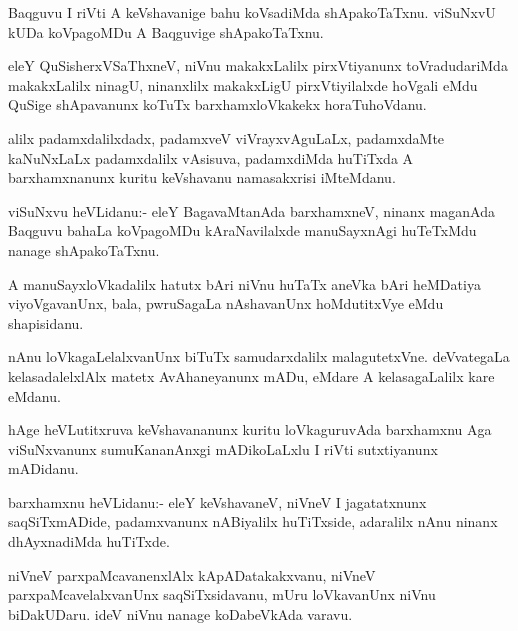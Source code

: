 \documentclass{article}
\begin{document}
\begin{mn}
Baqguvu I riVti A keVshavanige bahu koVsadiMda shApakoTaTxnu. viSuNxvU
kUDa koVpagoMDu A Baqguvige shApakoTaTxnu.
\end{mn}

\begin{mn}
eleY QuSisherxVSaThxneV, niVnu makakxLalilx pirxVtiyanunx
toVradudariMda makakxLalilx ninagU, ninanxlilx makakxLigU
pirxVtiyilalxde hoVgali eMdu QuSige shApavanunx koTuTx
barxhamxloVkakekx horaTuhoVdanu.
\end{mn}

\begin{mn}
alilx padamxdalilxdadx, padamxveV viVrayxvAguLaLx, padamxdaMte
kaNuNxLaLx padamxdalilx vAsisuva, padamxdiMda huTiTxda A
barxhamxnanunx kuritu keVshavanu namasakxrisi iMteMdanu.
\end{mn}

\begin{mn}%
viSuNxvu heVLidanu:- eleY BagavaMtanAda barxhamxneV, ninanx maganAda
Baqguvu bahaLa koVpagoMDu kAraNavilalxde manuSayxnAgi huTeTxMdu nanage shApakoTaTxnu.
\end{mn}

\begin{mn}
A manuSayxloVkadalilx hatutx bAri niVnu huTaTx aneVka bAri heMDatiya
viyoVgavanUnx, bala, pwruSagaLa nAshavanUnx hoMdutitxVye eMdu shapisidanu.
\end{mn}

\begin{mn}%
nAnu loVkagaLelalxvanUnx biTuTx samudarxdalilx
malagutetxVne. deVvategaLa kelasadalelxlAlx matetx AvAhaneyanunx mADu,
eMdare A kelasagaLalilx kare eMdanu.
\end{mn}

\begin{mn}
hAge heVLutitxruva keVshavananunx kuritu loVkaguruvAda barxhamxnu Aga
viSuNxvanunx sumuKananAnxgi mADikoLaLxlu I riVti sutxtiyanunx mADidanu.
\end{mn}

\begin{mn}
barxhamxnu heVLidanu:- eleY keVshavaneV, niVneV I jagatatxnunx
saqSiTxmADide, padamxvanunx nABiyalilx huTiTxside, adaralilx nAnu
ninanx dhAyxnadiMda huTiTxde.
\end{mn}

\begin{mn}%
niVneV parxpaMcavanenxlAlx kApADatakakxvanu, niVneV
parxpaMcavelalxvanUnx saqSiTxsidavanu, mUru loVkavanUnx niVnu
biDakUDaru. ideV niVnu nanage koDabeVkAda varavu.
\end{mn}
\end{document}

